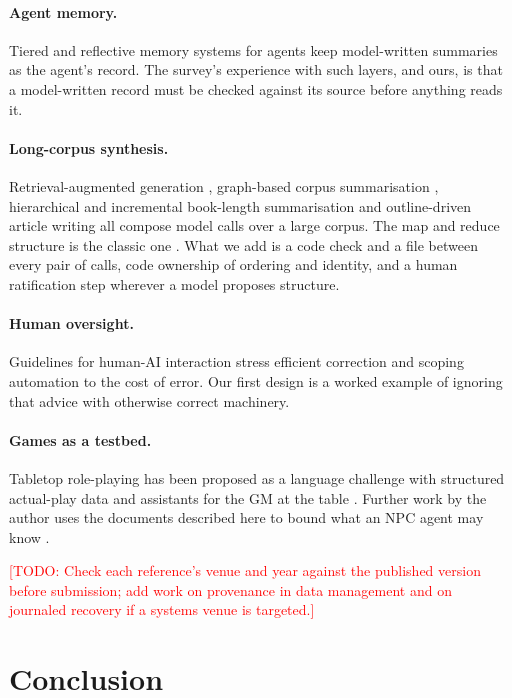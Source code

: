 \documentclass[11pt]{article}
\newcommand{\todo}[1]{\textcolor{red}{[TODO: #1]}}
\begin{document}
\paragraph{Agent memory.} Tiered and reflective memory systems for agents
\citep{packer2023memgpt,park2023generative} keep model-written summaries as the agent's
record. The survey's experience with such layers, and ours, is that a model-written
record must be checked against its source before anything reads it.

\paragraph{Long-corpus synthesis.} Retrieval-augmented generation
\citep{lewis2020rag}, graph-based corpus summarisation \citep{edge2024graphrag},
hierarchical and incremental book-length summarisation \citep{chang2024booookscore} and
outline-driven article writing \citep{shao2024storm} all compose model calls over a
large corpus. The map and reduce structure is the classic one \citep{dean2004mapreduce}.
What we add is a code check and a file between every pair of calls, code ownership of
ordering and identity, and a human ratification step wherever a model proposes
structure.

\paragraph{Human oversight.} Guidelines for human-AI interaction \citep{amershi2019}
stress efficient correction and scoping automation to the cost of error. Our first
design is a worked example of ignoring that advice with otherwise correct machinery.

\paragraph{Games as a testbed.} Tabletop role-playing has been proposed as a language
challenge \citep{callisonburch2022dnd} with structured actual-play data
\citep{zhu2023fireball} and assistants for the GM at the table \citep{zhu2023calypso}.
Further work by the author uses the documents described here to bound what an NPC agent
may know \citep{roussos2026horizon}.

\todo{Check each reference's venue and year against the published version before
submission; add work on provenance in data management and on journaled recovery if a
systems venue is targeted.}

\section{Conclusion}
\end{document}
